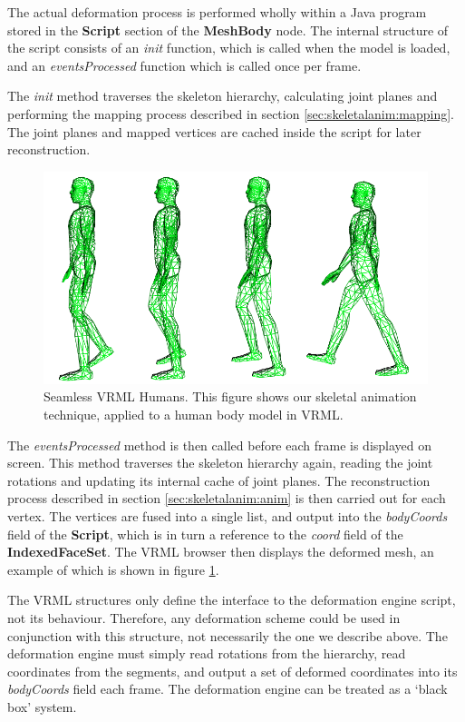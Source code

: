 The actual deformation process is performed wholly within a Java program stored in the {\bf Script} section of the {\bf MeshBody} node. The internal structure of the script consists of an {\it init} function, which is called when the model is loaded, and an {\it eventsProcessed} function which is called once per frame.

The {\it init} method traverses the skeleton hierarchy, calculating joint planes and performing the mapping process described in section \ref{sec:skeletalanim:mapping}. The joint planes and mapped vertices are cached inside the script for later reconstruction. 

\begin{figure}
\begin{center}
\includegraphics[width=14cm]{../images/simpleanimation}
\caption[Seamless VRML Humans]{\label{fig:simplesegments} Seamless VRML Humans. This figure shows our skeletal animation technique, applied to a human body model in VRML. }
\end{center}
\end{figure}

The {\it eventsProcessed} method is then called before each frame is displayed on screen. This method traverses the skeleton hierarchy again, reading the joint rotations and updating its internal cache of joint planes. The reconstruction process described in section \ref{sec:skeletalanim:anim} is then carried out for each vertex. The vertices are fused into a single list, and output into the {\it bodyCoords} field of the {\bf Script}, which is in turn a reference to the {\it coord} field of the {\bf IndexedFaceSet}. The VRML browser then displays the deformed mesh, an example of which is shown in figure \ref{fig:simplesegments}.

The VRML structures only define the interface to the deformation engine script, not its behaviour. Therefore,  any deformation scheme could be used in conjunction with this structure, not necessarily the one we describe above. The deformation engine must simply read rotations from the hierarchy, read coordinates from the segments, and output a  set of deformed coordinates into its {\it bodyCoords} field each frame. The deformation engine can be treated as a `black box' system.

